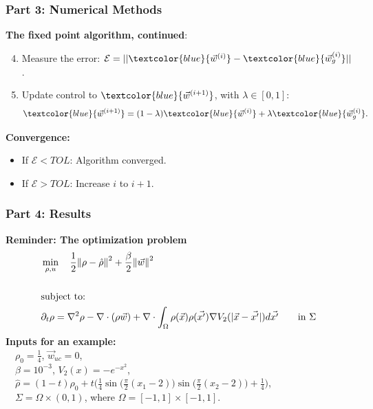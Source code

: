 \documentclass[aspectratio=169,xcolor=dvipsnames]{beamer}
\begin{document}
\begin{frame}
	\frametitle{Part 3: Numerical Methods}
	\textbf{The fixed point algorithm, continued}:\\
    \vspace{0.3cm}
   \begin{enumerate}
   	\setcounter{enumi}{3}
   	\item Measure the error: $\mathcal{E} = ||\textcolor{blue}{\vec{w}^{(i)}} - \textcolor{blue}{\vec{w}^{(i)}_g}||$.
   	\item Update control to $\textcolor{blue}{\vec{w}^{(i+1)}}$, with $\lambda \in [0,1]$:
   	\begin{align*}
   	\textcolor{blue}{\vec{w}^{(i+1)}} = (1-\lambda)\textcolor{blue}{\vec{w}^{(i)}} + \lambda \textcolor{blue}{\vec{w}^{(i)}_g}.
   	\end{align*}
   \end{enumerate}
\vspace{0.5cm}
\textbf{Convergence:}\\
\begin{itemize}
\item If $\mathcal{E} <TOL$: Algorithm converged.
\item If $\mathcal{E} >TOL$: Increase $i$ to $i+1$.
\end{itemize}

\end{frame}
\begin{frame}
	\frametitle{Part 4: Results}

	\textbf{Reminder: The optimization problem}
	\begin{align*}
	&\min_{\rho,u} \quad \frac{1}{2}\norm{\rho- \hat{\rho}}^2 + \frac{\beta}{2} \norm{\vec{w}}^2\\
	\\
	&\text{subject to:}
	\\
	& \partial_t \rho = \nabla^2 \rho - \nabla \cdot (\rho \vec{w})+{\nabla \cdot \int_\Omega \rho(\vec{x}) \rho(\vec{x'}) \nabla V_2(|\vec{x}-\vec{x'}|)d\vec{x'}} \qquad \text{in    } \Sigma
	\end{align*}
    \textbf{Inputs for an example:}\\
    \vspace{0.2 cm}
    	$ \quad\rho_0 = \frac{1}{4}$, $\vec{w}_{uc} = 0$,\\
	    $ \quad\beta = 10^{-3}$, $V_2(x) = - e^{-x^2}$,\\
	    $\quad\widehat \rho = (1-t)\rho_0 + t\bigg(\frac{1}{4}\sin \bigg(\frac{\pi}{2}(x_1 - 2)\bigg)\sin \bigg(\frac{\pi}{2}(x_2 - 2)\bigg) + \frac{1}{4}\bigg)$,\\	
	    $\quad \Sigma = \Omega \times (0,1)$, where $\Omega = [-1,1]\times [-1,1]$.
\end{frame}
\end{document}
